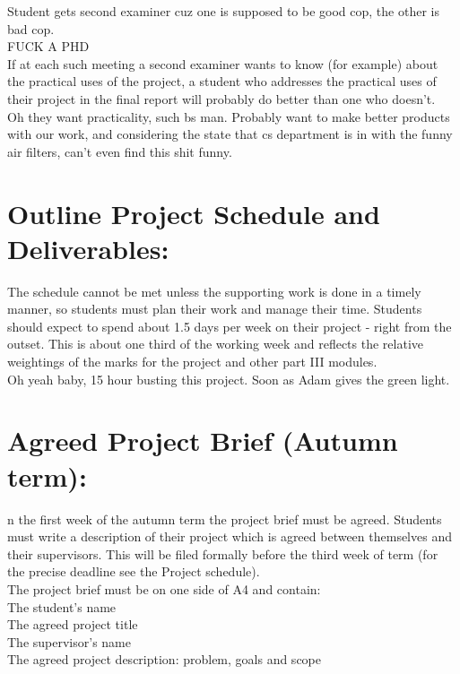 \documentclass [12pt]{article}
\begin{document}
Student gets second examiner cuz one is supposed to be good cop, the other is bad cop.\\ 

FUCK A PHD\\ 

If at each such meeting a second examiner wants to know (for example) about the practical uses of the project, a student who addresses the practical uses of their project in the final report will probably do better than one who doesn't. \\

Oh they want practicality, such bs man. Probably want to  make better products with our work, and considering the state that cs department is in with the funny air filters, can't even find this shit funny.\\ 

\section{Outline Project Schedule and Deliverables:}
The schedule cannot be met unless the supporting work is done in a timely manner, so students must plan their work and manage their time. Students should expect to spend about 1.5 days per week on their project - right from the outset. This is about one third of the working week and reflects the relative weightings of the marks for the project and other part III modules. \\

Oh yeah baby, 15 hour busting this project. Soon as Adam gives the green light.\\ 

\section{Agreed Project Brief (Autumn term):}

n the first week of the autumn term the project brief must be agreed. Students must write a description of their project which is agreed between themselves and their supervisors. This will be filed formally before the third week of term (for the precise deadline see the Project schedule).\\

The project brief must be on one side of A4 and contain:\\

    The student's name\\
    The agreed project title\\
    The supervisor's name\\
    The agreed project description: problem, goals and scope\\
\end{document}

